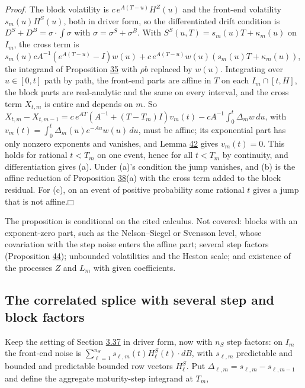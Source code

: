 \documentclass[11pt]{article}
\providecommand{\square}{\mdlgwhtsquare}
\begin{document}
\emph{Proof.} The block volatility is \(c\,e^{A(T-u)}H^Z(u)\) and the front-end volatility \(s_m(u)H^S(u)\), both in driver form, so the differentiated drift condition is \(D^S+D^B=\sigma\cdot\int\sigma\) with \(\sigma=\sigma^S+\sigma^B\). With \(S^S(u,T)=s_m(u)T+\kappa_m(u)\) on \(I_m\), the cross term is \(s_m(u)cA^{-1}(e^{A(T-u)}-I)w(u)+c\,e^{A(T-u)}w(u)(s_m(u)T+\kappa_m(u))\), the integrand of Proposition \hyperref[res:Proposition-35]{35} with \(\rho b\) replaced by \(w(u)\). Integrating over \(u\in[0,t]\) path by path, the front-end parts are affine in \(T\) on each \(I_m\cap[t,H]\), the block parts are real-analytic and the same on every interval, and the cross term \(X_{t,m}\) is entire and depends on \(m\). So \(X_{t,m}-X_{t,m-1}=c\,e^{AT}(A^{-1}+(T-T_m)I)v_m(t)-cA^{-1}\int_0^t\Delta_mw\,du\), with \(v_m(t)=\int_0^t\Delta_m(u)e^{-Au}w(u)\,du\), must be affine; its exponential part has only nonzero exponents and vanishes, and Lemma \hyperref[res:Lemma-42]{42} gives \(v_m(t)=0\). This holds for rational \(t<T_m\) on one event, hence for all \(t<T_m\) by continuity, and differentiation gives (a). Under (a)'s condition the jump vanishes, and (b) is the affine reduction of Proposition \hyperref[res:Proposition-38]{38}(a) with the cross term added to the block residual. For (c), on an event of positive probability some rational \(t\) gives a jump that is not affine.\hfill$\square$

The proposition is conditional on the cited calculus. Not covered: blocks with an exponent-zero part, such as the Nelson--Siegel or Svensson level, whose covariation with the step noise enters the affine part; several step factors (Proposition \hyperref[res:Proposition-44]{44}); unbounded volatilities and the Heston scale; and existence of the processes \(Z\) and \(L_m\) with given coefficients.

\subsection{The correlated splice with several step and block factors}\label{sec:3.38}

Keep the setting of Section \hyperref[sec:3.37]{3.37} in driver form, now with \(n_S\) step factors: on \(I_m\) the front-end noise is \(\sum_{\ell=1}^{n_S}s_{\ell,m}(t)H^S_\ell(t)\cdot dB\), with \(s_{\ell,m}\) predictable and bounded and predictable bounded row vectors \(H^S_\ell\). Put \(\Delta_{\ell,m}=s_{\ell,m}-s_{\ell,m-1}\) and define the aggregate maturity-step integrand at \(T_m\),
\end{document}
